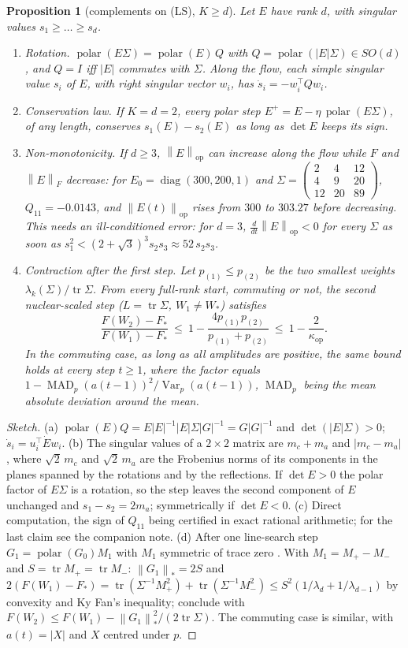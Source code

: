 \documentclass[11pt]{article}
\newtheorem{proposition}[theorem]{Proposition}
\newcommand{\nop}[1]{\left\|#1\right\|_{\mathrm{op}}}
\newcommand{\nnuc}[1]{\left\|#1\right\|_{*}}
\newcommand{\nF}[1]{\left\|#1\right\|_{F}}
\newcommand{\abs}[1]{\left|#1\right|}
\newcommand{\tr}{\operatorname{tr}}
\newcommand{\diag}{\operatorname{diag}}
\newcommand{\polar}{\operatorname{polar}}
\newcommand{\Var}{\operatorname{Var}}
\newcommand{\MAD}{\operatorname{MAD}}
\newcommand{\kop}{\kappa_{\mathrm{op}}}
\begin{document}
\begin{proposition}[complements on (LS), $K\ge d$]\label{prop:ls}
Let $E$ have rank $d$, with singular values $s_1\ge\dots\ge s_d$.
\begin{enumerate}[label=(\alph*),itemsep=1pt,topsep=2pt]
\item \emph{Rotation.} $\polar(E\Sigma)=\polar(E)\,Q$ with $Q=\polar(\abs E\Sigma)\in SO(d)$, and $Q=I$ iff $\abs E$
commutes with $\Sigma$. Along the flow, each simple singular value $s_i$ of $E$, with right singular vector $w_i$,
has $\dot s_i=-w_i^\top Qw_i$.
\item \emph{Conservation law.} If $K=d=2$, every polar step $E^+=E-\eta\,\polar(E\Sigma)$, of any length, conserves
$s_1(E)-s_2(E)$ as long as $\det E$ keeps its sign.
\item \emph{Non-monotonicity.} If $d\ge3$, $\nop E$ can increase along the flow while $F$ and $\nF E$ decrease: for
$E_0=\diag(300,200,1)$ and $\Sigma=\left(\begin{smallmatrix}2&4&12\\4&9&20\\12&20&89\end{smallmatrix}\right)$,
$Q_{11}=-0.0143$, and $\nop{E(t)}$ rises from $300$ to $303.27$ before decreasing. This needs an ill-conditioned
error: for $d=3$, $\frac d{dt}\nop E<0$ for every $\Sigma$ as soon as $s_1^2<(2+\sqrt3)^3s_2s_3\approx52\,s_2s_3$.
\item \emph{Contraction after the first step.} Let $p_{(1)}\le p_{(2)}$ be the two smallest weights
$\lambda_k(\Sigma)/\tr\Sigma$. From every full-rank start, commuting or not, the second nuclear-scaled step
($L=\tr\Sigma$, $W_1\ne W_\ast$) satisfies
\[
\frac{F(W_2)-F_\ast}{F(W_1)-F_\ast}\ \le\ 1-\frac{4p_{(1)}p_{(2)}}{p_{(1)}+p_{(2)}}\ \le\ 1-\frac2{\kop}.
\]
In the commuting case, as long as all amplitudes are positive, the same bound holds at every step $t\ge1$, where the
factor equals $1-\MAD_p(a(t-1))^2/\Var_p(a(t-1))$, $\MAD_p$ being the mean absolute deviation around the mean.
\end{enumerate}
\end{proposition}
\begin{proof}[Sketch]
(a) $\polar(E)Q=E\abs E^{-1}\abs E\Sigma\abs G^{-1}=G\abs G^{-1}$ and $\det(\abs E\Sigma)>0$; $\dot s_i=u_i^\top\dot Ew_i$.
(b) The singular values of a $2\times2$ matrix are $m_c+m_a$ and $\abs{m_c-m_a}$, where $\sqrt2\,m_c$ and
$\sqrt2\,m_a$ are the Frobenius norms of its components in the planes spanned by the rotations and by the reflections.
If $\det E>0$ the polar factor of $E\Sigma$ is a rotation, so the step leaves the second component of $E$ unchanged
and $s_1-s_2=2m_a$; symmetrically if $\det E<0$. (c) Direct computation, the sign of $Q_{11}$ being certified in exact
rational arithmetic; for the last claim see the companion note. (d) After one line-search step
$G_1=\polar(G_0)M_1$ with $M_1$ symmetric of trace zero \cite{shulgin2026quadratic}. With $M_1=M_+-M_-$ and
$S=\tr M_+=\tr M_-$: $\nnuc{G_1}=2S$ and
$2(F(W_1)-F_\ast)=\tr(\Sigma^{-1}M_+^2)+\tr(\Sigma^{-1}M_-^2)\le S^2(1/\lambda_d+1/\lambda_{d-1})$ by convexity and
Ky Fan's inequality; conclude with $F(W_2)\le F(W_1)-\nnuc{G_1}^2/(2\tr\Sigma)$. The commuting case is similar, with
$a(t)=\abs X$ and $X$ centred under $p$.
\end{proof}
\end{document}
